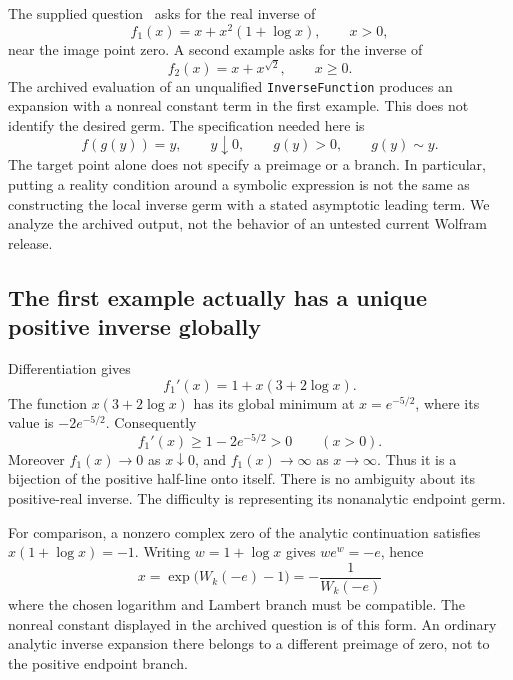 \documentclass[11pt,a4paper]{article}
\numberwithin{equation}{section}
\theoremstyle{definition}\newtheorem{definition}[theorem]{Definition}
\theoremstyle{remark}\newtheorem{remark}[theorem]{Remark}
\DeclareRobustCommand{\code}[1]{{\small\ttfamily\urlstyle{same}\nolinkurl{#1}}}
\begin{document}
The supplied question~\cite{question} asks for the real inverse of
\begin{equation}\label{eq:f1}
 f_1(x)=x+x^2(1+\log x),\qquad x>0,
\end{equation}
near the image point zero. A second example asks for the inverse of
\begin{equation}\label{eq:f2}
 f_2(x)=x+x^{\sqrt2},\qquad x\ge0.
\end{equation}
The archived evaluation of an unqualified \code{InverseFunction} produces
an expansion with a nonreal constant term in the first example. This does
not identify the desired germ. The specification needed here is
\begin{equation}\label{eq:branch-unit}
 f(g(y))=y,\qquad y\downarrow0,\qquad g(y)>0,\qquad g(y)\sim y.
\end{equation}
The target point alone does not specify a preimage or a branch. In particular,
putting a reality condition around a symbolic expression is not the same as
constructing the local inverse germ with a stated asymptotic leading term.
We analyze the archived output, not the behavior of an untested current
Wolfram release.

\subsection{The first example actually has a unique positive inverse globally}
Differentiation gives
\[
 f_1'(x)=1+x(3+2\log x).
\]
The function \(x(3+2\log x)\) has its global minimum at \(x=e^{-5/2}\),
where its value is \(-2e^{-5/2}\). Consequently
\begin{equation}\label{eq:global-slope}
 f_1'(x)\ge 1-2e^{-5/2}>0\qquad(x>0).
\end{equation}
Moreover \(f_1(x)\to0\) as \(x\downarrow0\), and \(f_1(x)\to\infty\) as
\(x\to\infty\). Thus it is a bijection of the positive half-line onto itself.
There is no ambiguity about its positive-real inverse. The difficulty is
representing its nonanalytic endpoint germ.

For comparison, a nonzero complex zero of the analytic continuation satisfies
\(x(1+\log x)=-1\). Writing \(w=1+\log x\) gives \(we^w=-e\), hence
\[
 x=\exp\!\bigl(W_k(-e)-1\bigr)=-\frac1{W_k(-e)}
\]
where the chosen logarithm and Lambert branch must be compatible. The
nonreal constant displayed in the archived question is of this form. An
ordinary analytic inverse expansion there belongs to a different preimage
of zero, not to the positive endpoint branch.
\end{document}
